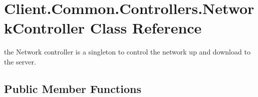 \hypertarget{classClient_1_1Common_1_1Controllers_1_1NetworkController}{}\section{Client.\+Common.\+Controllers.\+Network\+Controller Class Reference}
\label{classClient_1_1Common_1_1Controllers_1_1NetworkController}


the Network controller is a singleton to control the network up and download to the server.  


\subsection*{Public Member Functions}
